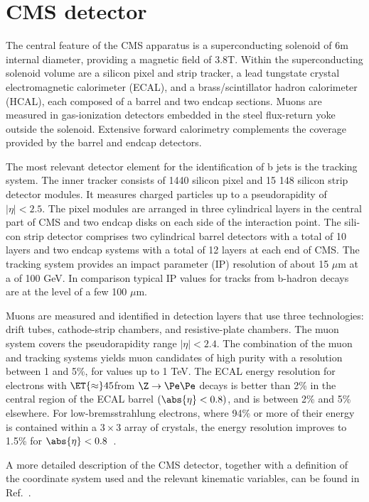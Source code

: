 \section{CMS detector}
\label{sec:cms}


The central feature of the CMS apparatus is a superconducting solenoid
of 6\unit{m} internal diameter, providing a magnetic field of
3.8\unit{T}. Within the superconducting solenoid volume are a silicon
pixel and strip tracker, a lead tungstate crystal electromagnetic
calorimeter (ECAL), and a brass/scintillator hadron calorimeter
(HCAL), each composed of a barrel and two endcap sections. Muons are
measured in gas-ionization detectors embedded in the steel flux-return
yoke outside the solenoid. Extensive forward calorimetry complements
the coverage provided by the barrel and endcap detectors.

The most relevant detector element for the identification of b jets is
the tracking system. The inner tracker consists of 1440 silicon pixel
and 15 148 silicon strip detector modules. It measures charged
particles up to a pseudorapidity of $|\eta| < 2.5$. The pixel modules
are arranged in three cylindrical layers in the central part of CMS
and two endcap disks on each side of the interaction point. The sili-
con strip detector comprises two cylindrical barrel detectors with a
total of 10 layers and two endcap systems with a total of 12 layers at
each end of CMS. The tracking system provides an impact parameter (IP)
resolution of about 15 $\mu$m at a \pt of 100 GeV. In comparison
typical IP values for tracks from b-hadron decays are at the level of
a few 100 $\mu$m. 

Muons are measured and identified in detection layers that use three
technologies: drift tubes, cathode-strip chambers, and resistive-plate
chambers. The muon system covers the pseudorapidity range $|\eta| <
2.4$. The combination of the muon and tracking systems yields muon
candidates of high purity with a \pt resolution between 1 and 5\%, for
\pt values up to 1 TeV. The ECAL energy resolution for electrons with
$\ET {\approx} 45$\GeV from $\Z \rightarrow \Pe \Pe$ decays is better
than 2\% in the central region of the ECAL barrel $(\abs{\eta} <
0.8)$, and is between 2\% and 5\% elsewhere. For low-bremsstrahlung
electrons, where 94\% or more of their energy is contained within a $3
\times 3$ array of crystals, the energy resolution improves to 1.5\%
for $\abs{\eta} < 0.8$~\cite{Chatrchyan:2013dga}.

A more detailed description of the CMS detector, together with a
definition of the coordinate system used and the relevant kinematic
variables, can be found in Ref.~\cite{Chatrchyan:2008zzk}.

